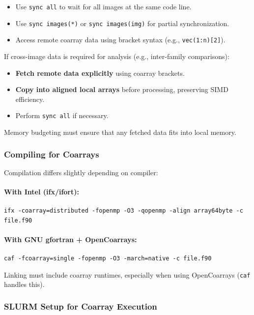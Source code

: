 \documentclass{article}
\begin{document}
\begin{itemize}
\item Use \texttt{sync all} to wait for all images at the same code line.
\item Use \texttt{sync images(*)} or \texttt{sync images(img)} for partial synchronization.
\item Access remote coarray data using bracket syntax (e.g., \texttt{vec(1:n)[2]}).
\end{itemize}

If cross-image data is required for analysis (e.g., inter-family comparisons):
\begin{itemize}
\item \textbf{Fetch remote data explicitly} using coarray brackets.
\item \textbf{Copy into aligned local arrays} before processing, preserving SIMD efficiency.
\item Perform \texttt{sync all} if necessary.
\end{itemize}

Memory budgeting must ensure that any fetched data fits into local memory.

\subsubsection{Compiling for Coarrays}
Compilation differs slightly depending on compiler:

\paragraph{With Intel (ifx/ifort):}
\begin{verbatim}
ifx -coarray=distributed -fopenmp -O3 -qopenmp -align array64byte -c file.f90
\end{verbatim}

\paragraph{With GNU gfortran + OpenCoarrays:}
\begin{verbatim}
caf -fcoarray=single -fopenmp -O3 -march=native -c file.f90
\end{verbatim}

Linking must include coarray runtimes, especially when using OpenCoarrays (\texttt{caf} handles this).

\subsubsection{SLURM Setup for Coarray Execution}
\end{document}
